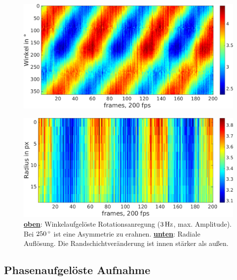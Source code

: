 \documentclass[numbers=noenddot,a4paper]{scrartcl}
\newcommand{\degree}{^\circ}
\newcommand{\fett}[1]{\textbf{#1}}
\begin{document}
            \begin{figure}[H]
                    \centering
                    \includegraphics[width=\textwidth,height=0.3\textheight]{figs/glowbeispielrotation3Hzang.png}
            \end{figure}

        \vspace{-0.5cm}

            \begin{figure}[H]
                    \centering
                    \includegraphics[width=\textwidth,height=0.3\textheight]{figs/glowbeispielrotation3Hzrad.png}
                    \caption{\underline{\fett{oben}}: Winkelaufgelöste Rotationsanregung ($\unit[3]{Hz}$, max. Amplitude). Bei $\unit[250]{\degree}$ ist eine Asymmetrie zu erahnen. \underline{\fett{unten}}: Radiale Auflösung. Die Randschichtveränderung ist innen stärker als außen.}
                    \label{img:glowanalys}
            \end{figure}
            
		\subsection{Phasenaufgelöste Aufnahme}
\end{document}
